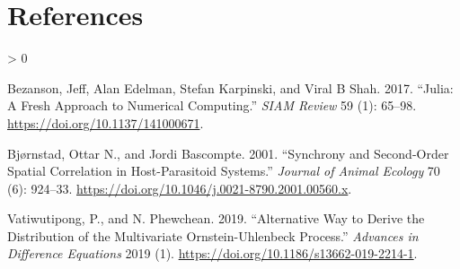 \documentclass{article}
\newlength{\cslhangindent}
\newenvironment{CSLReferences}[2] %
 {%
  \setlength{\parindent}{0pt}
  \ifodd #1 \everypar{\setlength{\hangindent}{\cslhangindent}}\ignorespaces\fi
  \ifnum #2 > 0
  \setlength{\parskip}{#2\baselineskip}
  \fi
 }%
 {}
\begin{document}
\newpage

\hypertarget{references}{%
\section*{References}\label{references}}

\hypertarget{refs}{}
\begin{CSLReferences}{1}{0}
\leavevmode\hypertarget{ref-Julia-2017}{}%
Bezanson, Jeff, Alan Edelman, Stefan Karpinski, and Viral B Shah. 2017.
{``Julia: A Fresh Approach to Numerical Computing.''} \emph{SIAM
{R}eview} 59 (1): 65--98. \url{https://doi.org/10.1137/141000671}.

\leavevmode\hypertarget{ref-Bjrnstad2001}{}%
Bjørnstad, Ottar N., and Jordi Bascompte. 2001. {``Synchrony and
Second-Order Spatial Correlation in Host-Parasitoid Systems.''}
\emph{Journal of Animal Ecology} 70 (6): 924--33.
\url{https://doi.org/10.1046/j.0021-8790.2001.00560.x}.

\leavevmode\hypertarget{ref-Vatiwutipong2019}{}%
Vatiwutipong, P., and N. Phewchean. 2019. {``Alternative Way to Derive
the Distribution of the Multivariate Ornstein-Uhlenbeck Process.''}
\emph{Advances in Difference Equations} 2019 (1).
\url{https://doi.org/10.1186/s13662-019-2214-1}.

\end{CSLReferences}



\end{document}
